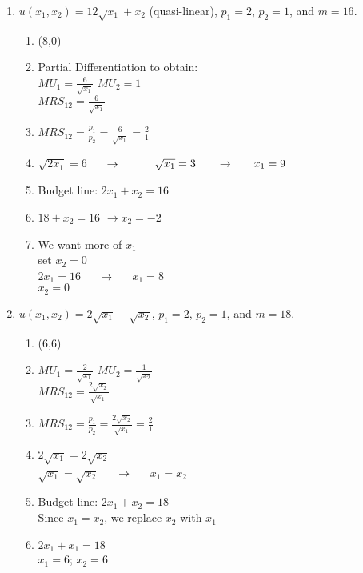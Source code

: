 \documentclass[11pt]{article}
\begin{document}
\begin{enumerate}
\begin{enumerate}
        \item $u(x_{1},x_{2})=12\sqrt{x_{1}}+x_{2}$ (quasi-linear), $p_{1}=2$, $p_{2}=1$, and $m=16$.
        \begin{enumerate}
            \item (8,0)
            \item Partial Differentiation to obtain:\\
            $MU_1 = \frac{6}{\sqrt{x_1}}$ $MU_2 = 1$\\
            $MRS_{12} = \frac{6}{\sqrt{x_1}}$
            \item $MRS_{12} = \frac{p_1}{p_2}= \frac{6}{\sqrt{x_1}} = \frac{2}{1}$\\
            \item $\sqrt{2x_1} = 6$ $\hspace{0.5 cm}\rightarrow \hspace{0.5 cm}$ $\hspace{0.5 cm} \sqrt{x_1} = 3 \hspace{0.5 cm}$ $\rightarrow$ $\hspace{0.5 cm} x_1 = 9$
            \item Budget line: $2x_1+x_2=16$
            \item $18 + x_2 =16$ $\rightarrow x_2=-2$
            \item We want more of $x_1$\\
            set $x_2 = 0$\\
            $2x_1=16$ $\hspace{0.5 cm} \rightarrow \hspace{0.5 cm}$ $x_1=8$\\
            $x_2=0$
        \end{enumerate}

        \item $u(x_{1},x_{2})=2\sqrt{x_{1}}+\sqrt{x_{2}}$, $p_{1}=2$, $p_{2}=1$, and $m=18$.
        \begin{enumerate}
            \item (6,6)
            \item $MU_1 = \frac{2}{\sqrt{x_1}}$ $MU_2 = \frac{1}{\sqrt{x_2}}$\\
            $MRS_{12} = \frac{2\sqrt{x_2}}{\sqrt{x_1}}$
            \item $MRS_{12} = \frac{p_1}{p_2}= \frac{2\sqrt{x_2}}{\sqrt{x_1}} = \frac{2}{1}$
            \item $2\sqrt{x_1} = 2\sqrt{x_2}$ \\
            $\sqrt{x_1} = \sqrt{x_2}$ $\hspace{0.5cm} \rightarrow \hspace{0.5cm}$ $x_1 = x_2$
            \item Budget line: $2x_1+x_2=18$\\
            Since $x_1=x_2$, we replace $x_2$ with $x_1$
            \item $2x_1+x_1=18$\\
            $x_1=6$; $x_2=6$
            

\end{enumerate}
\end{enumerate}
\end{enumerate}
\end{document}
